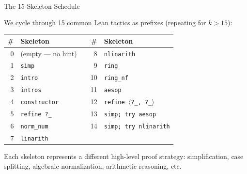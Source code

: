 \documentclass[aspectratio=169]{beamer}
\begin{document}
\begin{frame}{The 15-Skeleton Schedule}

We cycle through 15 common Lean tactics as prefixes (repeating for $k > 15$):

\vspace{0.5em}
\centering
{\small
\begin{tabular}{rlcrl}
\toprule
\textbf{\#} & \textbf{Skeleton} & \phantom{xx} & \textbf{\#} & \textbf{Skeleton} \\
\midrule
0 & (empty --- no hint) && 8 & \texttt{nlinarith} \\
1 & \texttt{simp} && 9 & \texttt{ring} \\
2 & \texttt{intro} && 10 & \texttt{ring\_nf} \\
3 & \texttt{intros} && 11 & \texttt{aesop} \\
4 & \texttt{constructor} && 12 & \texttt{refine $\langle$?\_,\,?\_$\rangle$} \\
5 & \texttt{refine ?\_} && 13 & \texttt{simp; try aesop} \\
6 & \texttt{norm\_num} && 14 & \texttt{simp; try nlinarith} \\
7 & \texttt{linarith} && & \\
\bottomrule
\end{tabular}
}

\vspace{0.5em}
\flushleft
Each skeleton represents a different high-level proof strategy: simplification, case splitting, algebraic normalization, arithmetic reasoning, etc.
\end{frame}
\end{document}
